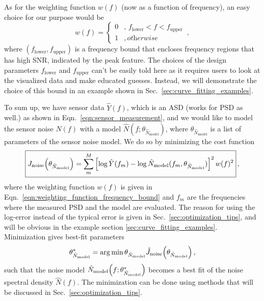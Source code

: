 As for the weighting function $w(f)$ (now as a function of frequency), an easy choice for our purpose would be
\begin{equation}
	w(f)=
	\begin{cases}
		0 &,\, f_\mathrm{lower}<f<f_\mathrm{upper} \\
		1 &,\, \textit{otherwise}
	\end{cases}
	\,,
	\label{eqn:weighting_function_frequency_bound}
\end{equation}
where $\left(f_\mathrm{lower},f_\mathrm{upper}\right)$ is a frequency bound that encloses frequency regions that has high SNR, indicated by the peak feature.
The choices of the design parameters $f_\mathrm{lower}$ and $f_\mathrm{upper}$ can't be easily told here as it requires users to look at the visualized data and make educated guesses.
Instead, we will demonstrate the choice of this bound in an example shown in Sec.~\ref{sec:curve_fitting_examples}.

To sum up, we have sensor data $\hat{Y}(f)$, which is an ASD (works for PSD as well.) as shown in Eqn.~\eqref{eqn:sensor_measurement}, and we would like to model the sensor noise $\hat{N}(f)$ with a model $\hat{N}(f;\theta_{\hat{N}_\mathrm{model}})$, where $\theta_{\hat{N}_\mathrm{model}}$ is a list of parameters of the sensor noise model.
We do so by minimizing the cost function
\begin{equation}
	\boxed{
		J_\mathrm{noise}\mleft(\theta_{\hat{N}_\mathrm{model}}\mright)=\sum_m^M\left[\log\hat{Y}(f_m)-\log\hat{N}_\mathrm{model}(f_m, \theta_{\hat{N}_\mathrm{model}})\right]^2 w(f)^2
	}\,,
	\label{eqn:noise_cost_function}
\end{equation}
where the weighting function $w(f)$ is given in Eqn.~\eqref{eqn:weighting_function_frequency_bound} and $f_m$ are the frequencies where the measured PSD and the model are evaluated.
The reason for using the log-error instead of the typical error is given in Sec.~\ref{sec:optimization_tips}, and will be obvious in the example section \ref{sec:curve_fitting_examples}.
Minimization gives best-fit parameters
\begin{equation}
	\theta_{\hat{N}_\mathrm{model}}^*=\arg\min{\theta_{\hat{N}_\mathrm{model}}} \hat{J}_\mathrm{noise}\mleft(\theta_{\hat{N}_\mathrm{model}}\mright)\,,
\end{equation} such that the noise model $\hat{N}_\mathrm{model}\mleft(f;\theta_{\hat{N}_\mathrm{model}}^*\mright)$ becomes a best fit of the noise spectral density $\hat{N}(f)$.
The minimization can be done using methods that will be discussed in Sec.~\ref{sec:optimization_tips}.
